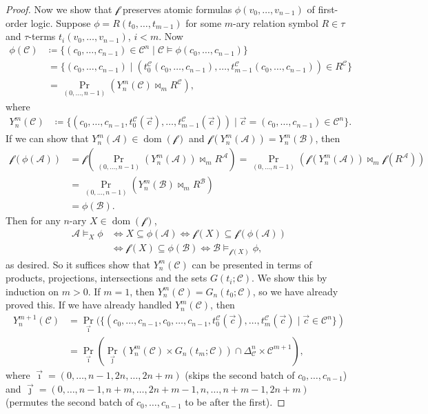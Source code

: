 \documentclass[10pt,a4paper]{amsart}
\newcommand{\A}{\mathcal{A}}
\newcommand{\B}{\mathcal{B}}
\newcommand{\C}{\mathcal{C}}
\DeclareMathOperator{\dom}{dom}
\newcommand{\f}{\mathcal{f}}
\begin{document}
\begin{proof}
    Now we show that $\f$ preserves atomic formulas $\phi(v_0,\dots,v_{n-1})$ of first-order logic. Suppose $\phi = R(t_0,\dots,t_{m-1})$ for some $m$-ary relation symbol $R\in\tau$ and $\tau$-terms $t_i(v_0,\dots,v_{n-1})$, $i<m$. Now
    \begin{align*}
        \phi(\C) &\coloneqq \{ (c_0,\dots,c_{n-1})\in\C^n \mid \C\models\phi(c_0,\dots,c_{n-1}) \} \\
        &\,= \{ (c_0,\dots,c_{n-1}) \mid (t_0^\C(c_0,\dots,c_{n-1}),\dots,t_{m-1}^\C(c_0,\dots,c_{n-1}))\in R^\C \} \\
        &\,= \Pr_{(0,\dots,n-1)}( Y^m_n(\C) \bowtie_m R^\C ),
    \end{align*}
    where
    \begin{align*}
        Y^m_n(\C) &\coloneqq \{ (c_0,\dots,c_{n-1},t_0^\C(\vec c),\dots,t_{m-1}^\C(\vec c)) \mid \vec c = (c_0,\dots,c_{n-1})\in\C^n \}.
    \end{align*}
    If we can show that $Y^m_n(\A)\in\dom(\f)$ and $\f(Y^m_n(\A)) = Y^m_n(\B)$, then
    \begin{align*}
        \f(\phi(\A)) &= \f\left( \Pr_{(0,\dots,n-1)}(Y^m_n(\A))\bowtie_m R^\A \right) = \Pr_{(0,\dots,n-1)}( \f(Y^m_n(\A))\bowtie_m\f(R^\A) ) \\
        &= \Pr_{(0,\dots,n-1)}(Y^m_n(\B)\bowtie_m R^\B) \\
        &= \phi(\B).
    \end{align*}
    Then for any $n$-ary $X\in\dom(\f)$,
    \begin{align*}
        \A\models_X\phi &\iff X\subseteq\phi(\A) \iff \f(X) \subseteq \f(\phi(\A)) \\
        &\iff \f(X) \subseteq\phi(\B) \iff \B\models_{\f(X)}\phi,
    \end{align*}
    as desired. So it suffices show that $Y^m_n(\C)$ can be presented in terms of products, projections, intersections and the sets $G(t_i;\C)$. We show this by induction on $m>0$. If $m=1$, then $Y^m_n(\C) = G_n(t_0;\C)$, so we have already proved this. If we have already handled $Y^m_n(\C)$, then
    \begin{align*}
        Y^{m+1}_n(\C) &= \Pr_{\vec\imath}(\{(c_0,\dots,c_{n-1},c_0,\dots,c_{n-1},t_0^\C(\vec c),\dots,t_m^\C(\vec c) \mid \vec c\in\C^n\}) \\
        &= \Pr_{\vec\imath}(\Pr_{\vec\jmath}(Y^m_n(\C)\times G_n(t_m;\C))\cap\Delta^n_\C\times\C^{m+1}),
    \end{align*}
    where $\vec\imath = (0,\dots,n-1,2n,\dots,2n+m)$ (skips the second batch of $c_0,\dots,c_{n-1}$) and $\vec\jmath = (0,\dots,n-1,n+m,\dots,2n+m-1,n,\dots,n+m-1,2n+m)$ (permutes the second batch of $c_0,\dots,c_{n-1}$ to be after the first).


\end{proof}
\end{document}
